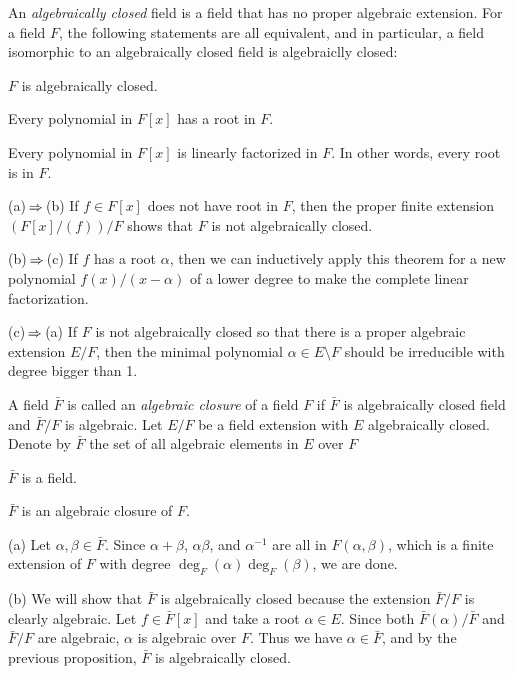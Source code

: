 \documentclass{../../large}
\begin{document}
\begin{prb}
An \emph{algebraically closed} field is a field that has no proper algebraic extension.
For a field $F$, the following statements are all equivalent, and in particular, a field isomorphic to an algebraically closed field is algebraiclly closed:
\begin{parts}
\item $F$ is algebraically closed.
\item Every polynomial in $F[x]$ has a root in $F$.
\item Every polynomial in $F[x]$ is linearly factorized in $F$. In other words, every root is in $F$.
\end{parts}
\end{prb}
\begin{pf}
(a)$\impl$(b)
If $f\in F[x]$ does not have root in $F$, then the proper finite extension $(F[x]/(f))/F$ shows that $F$ is not algebraically closed.

(b)$\impl$(c)
If $f$ has a root $\alpha$, then we can inductively apply this theorem for a new polynomial $f(x)/(x-\alpha)$ of a lower degree to make the complete linear factorization.

(c)$\impl$(a)
If $F$ is not algebraically closed so that there is a proper algebraic extension $E/F$, then the minimal polynomial $\alpha\in E\setminus F$ should be irreducible with degree bigger than 1.
\end{pf}


\begin{prb}
A field $\bar F$ is called an \emph{algebraic closure} of a field $F$ if $\bar F$ is algebraically closed field and $\bar F/F$ is algebraic.
Let $E/F$ be a field extension with $E$ algebraically closed.
Denote by $\bar F$ the set of all algebraic elements in $E$ over $F$
\begin{parts}
\item $\bar F$ is a field.
\item $\bar F$ is an algebraic closure of $F$.
\end{parts}
\end{prb}
\begin{pf}
(a)
Let $\alpha,\beta\in\bar F$.
Since $\alpha+\beta$, $\alpha\beta$, and $\alpha^{-1}$ are all in $F(\alpha,\beta)$, which is a finite extension of $F$ with degree $\deg_F(\alpha)\deg_F(\beta)$, we are done.

(b)
We will show that $\bar F$ is algebraically closed because the extension $\bar F/F$ is clearly algebraic.
Let $f\in\bar F[x]$ and take a root $\alpha\in E$.
Since both $\bar F(\alpha)/\bar F$ and $\bar F/F$ are algebraic, $\alpha$ is algebraic over $F$.
Thus we have $\alpha\in\bar F$, and by the previous proposition, $\bar F$ is algebraically closed.
\end{pf}
\end{document}
